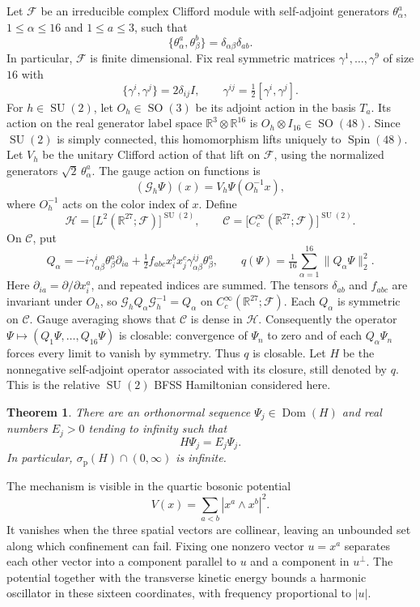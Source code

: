 \documentclass[11pt]{amsart}
\newcommand{\R}{\mathbb R}
\newcommand{\F}{\mathcal F}
\newcommand{\Core}{\mathcal C}
\newcommand{\Hphys}{\mathcal H}
\newcommand{\Spin}{\operatorname{Spin}}
\newcommand{\SU}{\operatorname{SU}}
\newcommand{\SO}{\operatorname{SO}}
\newcommand{\Dom}{\operatorname{Dom}}
\newcommand{\norm}[1]{\lVert #1\rVert}
\newtheorem{theorem}{Theorem}[section]
\theoremstyle{remark}
\numberwithin{equation}{section}
\begin{document}
Let $\F$ be an irreducible complex Clifford module with self-adjoint
generators $\theta_\alpha^a$, $1\leq\alpha\leq16$ and $1\leq a\leq3$,
such that
\[
 \{\theta_\alpha^a,\theta_\beta^b\}
   =\delta_{\alpha\beta}\delta_{ab}.
\]
In particular, $\F$ is finite dimensional. Fix real symmetric matrices
$\gamma^1,\ldots,\gamma^9$ of size $16$ with
\[
 \{\gamma^i,\gamma^j\}=2\delta_{ij}I,\qquad
 \gamma^{ij}=\tfrac12[\gamma^i,\gamma^j].
\]
For $h\in\SU(2)$, let $O_h\in\SO(3)$ be its adjoint action in the
basis $T_a$. Its action on the real generator label space
$\R^3\otimes\R^{16}$ is $O_h\otimes I_{16}\in\SO(48)$.
Since $\SU(2)$ is simply connected, this homomorphism lifts uniquely
to $\Spin(48)$. Let $V_h$ be the unitary Clifford action of that lift
on $\F$, using the normalized generators $\sqrt2\,\theta_\alpha^a$.
The gauge action on functions is
\[
 (\mathcal G_h\Psi)(x)=V_h\Psi(O_h^{-1}x),
\]
where $O_h^{-1}$ acts on the color index of $x$. Define
\[
 \Hphys=\bigl[L^2(\R^{27};\F)\bigr]^{\SU(2)},\qquad
 \Core=\bigl[C_c^\infty(\R^{27};\F)\bigr]^{\SU(2)}.
\]
On $\Core$, put
\begin{equation}
 Q_\alpha
 =-i\gamma^i_{\alpha\beta}\theta_\beta^a\partial_{ia}
   +\tfrac12 f_{abc}x_i^b x_j^c
      \gamma^{ij}_{\alpha\beta}\theta_\beta^a,
 \qquad
 q(\Psi)=\tfrac1{16}\sum_{\alpha=1}^{16}\norm{Q_\alpha\Psi}_2^2.
 \label{eq:supercharges}
\end{equation}
Here $\partial_{ia}=\partial/\partial x_i^a$, and repeated indices are
summed. The tensors $\delta_{ab}$ and $f_{abc}$ are invariant under
$O_h$, so $\mathcal G_hQ_\alpha\mathcal G_h^{-1}=Q_\alpha$ on
$C_c^\infty(\R^{27};\F)$. Each $Q_\alpha$ is symmetric on $\Core$.
Gauge averaging shows that $\Core$ is dense in $\Hphys$.
Consequently the operator
$\Psi\mapsto(Q_1\Psi,\ldots,Q_{16}\Psi)$ is closable: convergence of
$\Psi_n$ to zero and of each $Q_\alpha\Psi_n$ forces every limit to vanish
by symmetry. Thus $q$ is closable. Let $H$ be the nonnegative self-adjoint
operator associated with its closure, still denoted by $q$.
This is the relative $\SU(2)$ BFSS Hamiltonian considered here.

\begin{theorem}
\label{thm:main}
There are an orthonormal sequence
$\Psi_j\in\Dom(H)$ and real numbers $E_j>0$ tending to infinity such that
\[
 H\Psi_j=E_j\Psi_j.
\]
In particular, $\sigma_{\mathrm p}(H)\cap(0,\infty)$ is infinite.
\end{theorem}

The mechanism is visible in the quartic bosonic potential
\[
 V(x)=\sum_{a<b}|x^a\wedge x^b|^2.
\]
It vanishes when the three spatial vectors are collinear, leaving an
unbounded set along which confinement can fail. Fixing one nonzero vector
$u=x^a$ separates each other vector into a component parallel to $u$ and
a component in $u^\perp$. The potential together with the transverse
kinetic energy bounds a harmonic oscillator in these sixteen
coordinates, with frequency proportional to $|u|$.
\end{document}
